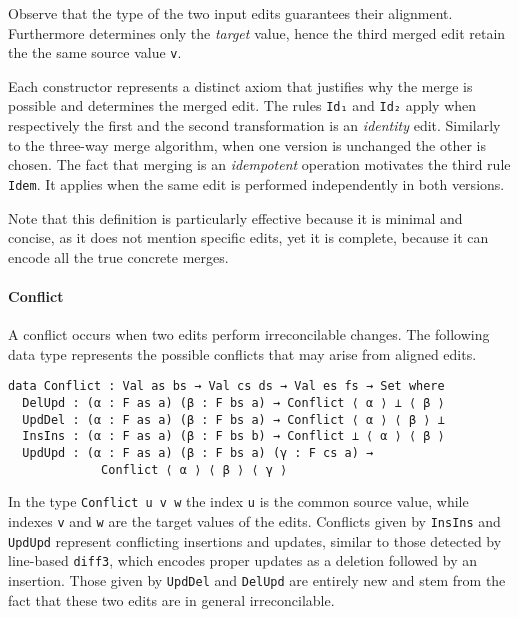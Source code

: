\documentclass[preprint]{sigplanconf}
\begin{document}
	Observe that the type of the two input edits guarantees their
        alignment.
        Furthermore determines only the \emph{target} value, hence the
        third merged edit retain the the same source value \texttt{v}.

	Each constructor represents a distinct axiom that justifies why
	the merge is possible and determines the merged edit.
	The rules \texttt{Id₁} and \texttt{Id₂} apply when 
	respectively the first and the second transformation is an \emph{identity} 
        edit.
	Similarly to the three-way merge algorithm, when one version is unchanged the other
        is chosen.
	The fact that merging is an \emph{idempotent} operation motivates the 
	third rule \texttt{Idem}.
	It applies when the same edit is performed independently in both versions.
	
	Note that this definition is particularly effective because it is 
	minimal and concise, as it does not mention specific
	edits, yet it is complete, because it can encode all the true concrete 
        merges.	

	\paragraph{Conflict}
	A conflict occurs when two edits perform irreconcilable changes.
	The following data type represents the possible conflicts that may arise
	from aligned edits.
	
\begin{verbatim}
data Conflict : Val as bs → Val cs ds → Val es fs → Set where
  DelUpd : (α : F as a) (β : F bs a) → Conflict ⟨ α ⟩ ⊥ ⟨ β ⟩
  UpdDel : (α : F as a) (β : F bs a) → Conflict ⟨ α ⟩ ⟨ β ⟩ ⊥ 
  InsIns : (α : F as a) (β : F bs b) → Conflict ⊥ ⟨ α ⟩ ⟨ β ⟩
  UpdUpd : (α : F as a) (β : F bs a) (γ : F cs a) →
             Conflict ⟨ α ⟩ ⟨ β ⟩ ⟨ γ ⟩    
\end{verbatim}

	In the type \texttt{Conflict u v w} the index \texttt{u} is
        the common source value, while indexes \texttt{v} and
        \texttt{w} are the target values of the edits.
        Conflicts given by \texttt{InsIns} and \texttt{UpdUpd}
        represent conflicting insertions and updates, similar
        to those detected by line-based \texttt{diff3}, which
        encodes proper updates as a deletion followed by an insertion.
        Those given by \texttt{UpdDel} and \texttt{DelUpd} are
        entirely new and stem from the fact that these two edits are
        in general irreconcilable.
\end{document}
